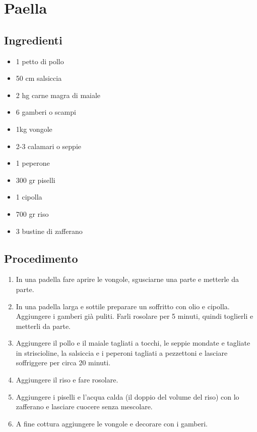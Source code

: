 \section{Paella}
\subsection{Ingredienti}
\begin{itemize}
\item 1 petto di pollo  
\item 50 cm salsiccia  
\item 2 hg carne magra di maiale  
\item 6 gamberi o scampi  
\item 1kg vongole  
\item 2-3 calamari o seppie  
\item 1 peperone  
\item 300 gr piselli  
\item 1 cipolla  
\item 700 gr riso  
\item 3 bustine di zafferano
\end{itemize}
\subsection{Procedimento}
\begin{enumerate}
\item  In una padella fare aprire le vongole, sgusciarne una parte e metterle da parte.  
\item  In una padella larga e sottile preparare un soffritto con olio e cipolla. Aggiungere i gamberi già puliti. Farli rosolare per 5 minuti, quindi toglierli e metterli da parte.  
\item  Aggiungere il pollo e il maiale tagliati a tocchi, le seppie mondate e tagliate in striscioline, la salsiccia e i peperoni tagliati a pezzettoni e lasciare soffriggere per circa 20 minuti.  
\item  Aggiungere il riso e fare rosolare.  
\item  Aggiungere i piselli e l'acqua calda (il doppio del volume del riso) con lo zafferano e lasciare cuocere senza mescolare.  
\item  A fine cottura aggiungere le vongole e decorare con i gamberi.
\end{enumerate}
